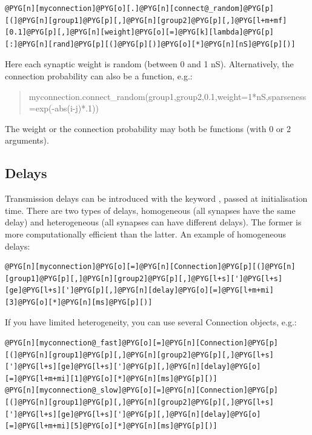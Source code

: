 \documentclass[letterpaper,10pt,english]{manual}
\begin{document}
\begin{Verbatim}[commandchars=@\[\]]
@PYG[n][myconnection]@PYG[o][.]@PYG[n][connect@_random]@PYG[p][(]@PYG[n][group1]@PYG[p][,]@PYG[n][group2]@PYG[p][,]@PYG[l+m+mf][0.1]@PYG[p][,]@PYG[n][weight]@PYG[o][=]@PYG[k][lambda]@PYG[p][:]@PYG[n][rand]@PYG[p][(]@PYG[p][)]@PYG[o][*]@PYG[n][nS]@PYG[p][)]
\end{Verbatim}

Here each synaptic weight is random (between 0 and 1 nS).
Alternatively, the connection probability can also be a function, e.g.:
\begin{quote}

myconnection.connect\_random(group1,group2,0.1,weight=1*nS,sparseness=exp(-abs(i-j)*.1))
\end{quote}

The weight or the connection probability may both be functions (with 0 or 2 arguments).


\subsection{Delays}

Transmission delays can be introduced with the keyword , passed at initialisation time.
There are two types of delays, homogeneous (all synapses have the same delay) and heterogeneous
(all synapses can have different delays). The former is more computationally efficient than the
latter. An example of homogeneous delays:

\begin{Verbatim}[commandchars=@\[\]]
@PYG[n][myconnection]@PYG[o][=]@PYG[n][Connection]@PYG[p][(]@PYG[n][group1]@PYG[p][,]@PYG[n][group2]@PYG[p][,]@PYG[l+s][']@PYG[l+s][ge]@PYG[l+s][']@PYG[p][,]@PYG[n][delay]@PYG[o][=]@PYG[l+m+mi][3]@PYG[o][*]@PYG[n][ms]@PYG[p][)]
\end{Verbatim}

If you have limited heterogeneity, you can use several Connection objects, e.g.:

\begin{Verbatim}[commandchars=@\[\]]
@PYG[n][myconnection@_fast]@PYG[o][=]@PYG[n][Connection]@PYG[p][(]@PYG[n][group1]@PYG[p][,]@PYG[n][group2]@PYG[p][,]@PYG[l+s][']@PYG[l+s][ge]@PYG[l+s][']@PYG[p][,]@PYG[n][delay]@PYG[o][=]@PYG[l+m+mi][1]@PYG[o][*]@PYG[n][ms]@PYG[p][)]
@PYG[n][myconnection@_slow]@PYG[o][=]@PYG[n][Connection]@PYG[p][(]@PYG[n][group1]@PYG[p][,]@PYG[n][group2]@PYG[p][,]@PYG[l+s][']@PYG[l+s][ge]@PYG[l+s][']@PYG[p][,]@PYG[n][delay]@PYG[o][=]@PYG[l+m+mi][5]@PYG[o][*]@PYG[n][ms]@PYG[p][)]
\end{Verbatim}
\end{document}
